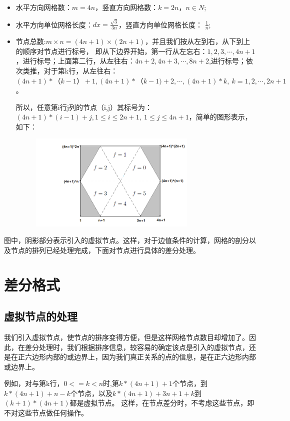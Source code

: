 \documentclass[a4paper,11pt]{ctexart} %
\begin{document}
\begin{itemize}
\item 水平方向网格数：$m=4n$，竖直方向网格数：$k=2n$，$n\in N$;
\item 水平方向单位网格长度：$dx=\frac{\sqrt{3}}{3n}$，竖直方向单位网格长度：
$\frac{1}{n}$;
\item 节点总数:$m\times n=(4n+1)\times(2n+1)$，并且我们按从左到右，从下到上的顺序对节点进行标号，
即从下边界开始，第一行从左忘右：$1,2,3,\cdots,4n+1$，进行标号；上面第二行，从左往右：$4n+2,4n+3,\cdots,8n+2$,进行标号；依次类推，对于第k行，从左往右：$(4n+1)*（k-1）+1,(4n+1)*（k-1)+2,\cdots,(4n+1)*k,\ k=1,2,\cdots,2n+1$。\par
所以，任意第i行j列的节点（i,j）其标号为：$(4n+1)*(i-1)+j,1\leq i\leq 2n+1,\ 1\leq j \leq 4n+1$，简单的图形表示，如下：\par
\begin{figure}[h]
\centering
\includegraphics[width=8cm]{tu1.png}
\label{fig:1}
\end{figure}
\end{itemize}
图中，阴影部分表示引入的虚拟节点。这样，对于边值条件的计算，网格的剖分以及节点的排列已经处理完成，下面对节点进行具体的差分处理。
\section{差分格式}
\subsection{虚拟节点的处理}
我们引入虚拟节点，使节点的排序变得方便，但是这样网格节点数目却增加了。因此，在差分处理时，我们根据排序信息，较容易的确定该点是引入的虚拟节点，还是在正六边形内部的或边界上，因为我们真正关系的点的信息，是在正六边形内部或边界上。\par
例如，对与第k行，$0<=k<n$时,第$k*(4n+1)+1$个节点，到$k*(4n+1)+n-k$个节点，以及$k*(4n+1)+3n+1+k$到$(k+1)*(4n+1)$都是虚拟节点。
这样，在节点差分时，不考虑这些节点，即不对这些节点做任何操作。
\end{document}
